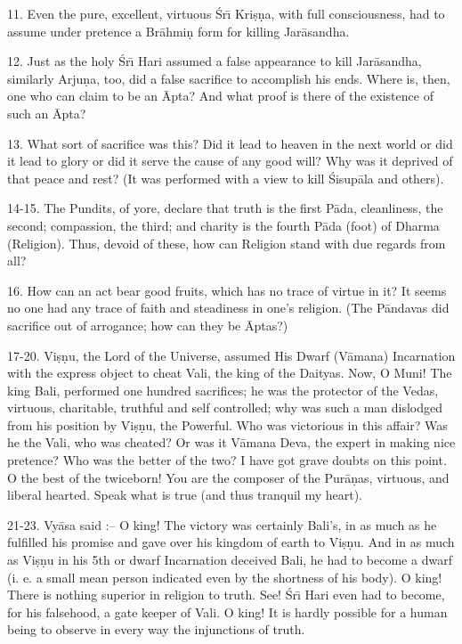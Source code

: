 11. Even the pure, excellent, virtuous \'Sr\={\i} Kri\d{s}\d{n}a, with full consciousness, had to assume under pretence a Br\=ahmi\d{n} form for killing Jar\=asandha.

12. Just as the holy \'Sr\={\i} Hari assumed a false appearance to kill Jar\=asandha, similarly Arju\d{n}a, too, did a false sacrifice to accomplish his ends. Where is, then, one who can claim to be an \=Apta? And what proof is there of the existence of such an \=Apta?

13. What sort of sacrifice was this? Did it lead to heaven in the next world or did it lead to glory or did it serve the cause of any good will? Why was it deprived of that peace and rest? (It was performed with a view to kill \'Sisup\=ala and others).

14-15. The Pundits, of yore, declare that truth is the first P\=ada, cleanliness, the second; compassion, the third; and charity is the fourth P\=ada (foot) of Dharma (Religion). Thus, devoid of these, how can Religion stand with due regards from all?

16. How can an act bear good fruits, which has no trace of virtue in it? It seems no one had any trace of faith and steadiness in one's religion. (The P\=andavas did sacrifice out of arrogance; how can they be \=Aptas?)

17-20. Vi\d{s}\d{n}u, the Lord of the Universe, assumed His Dwarf (V\=amana) Incarnation with the express object to cheat Vali, the king of the Daityas. Now, O Muni! The king Bali, performed one hundred sacrifices; he was the protector of the Vedas, virtuous, charitable, truthful and self controlled; why was such a man dislodged from his position by Vi\d{s}\d{n}u, the Powerful. Who was victorious in this affair? Was he the Vali, who was cheated? Or was it V\=amana Deva, the expert in making nice pretence? Who was the better of the two? I have got grave doubts on this point. O the best of the twiceborn! You are the
composer of the Pur\=a\d{n}as, virtuous, and liberal hearted. Speak what is true (and thus tranquil my heart).

21-23. Vy\=asa said :-- O king! The victory was certainly Bali's, in as much as he fulfilled his promise and gave over his kingdom of earth to Vi\d{s}\d{n}u. And in as much as Vi\d{s}\d{n}u in his 5th or dwarf Incarnation deceived Bali, he had to become a dwarf (i. e. a small mean person indicated even by the shortness of his body). O king! There is nothing superior in religion
to truth. See! \'Sr\={\i} Hari even had to become, for his falsehood, a gate keeper of Vali. O king! It is hardly possible for a human being to observe in every way the injunctions of truth.

